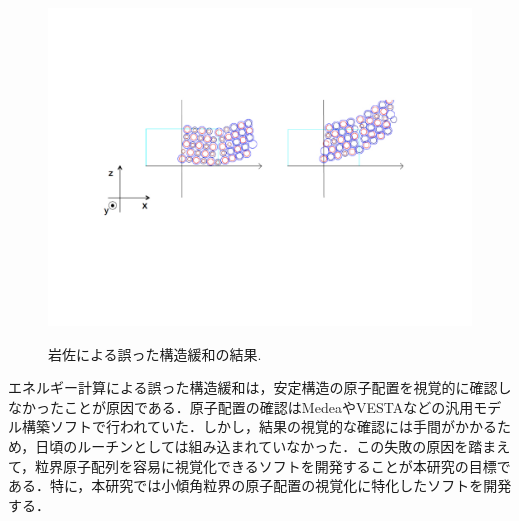 \begin{figure}[htbp]\begin{center}
\includegraphics[width=12cm,bb= 0 0 937 753]{../figs/./boundary_narita.004.jpeg}
\caption{岩佐による誤った構造緩和の結果.}
\label{fig:004}
\label{default}\end{center}\end{figure}
エネルギー計算による誤った構造緩和は，安定構造の原子配置を視覚的に確認しなかったことが原因である．原子配置の確認はMedeaやVESTAなどの汎用モデル構築ソフトで行われていた．しかし，結果の視覚的な確認には手間がかかるため，日頃のルーチンとしては組み込まれていなかった．この失敗の原因を踏まえて，粒界原子配列を容易に視覚化できるソフトを開発することが本研究の目標である．特に，本研究では小傾角粒界の原子配置の視覚化に特化したソフトを開発する．

